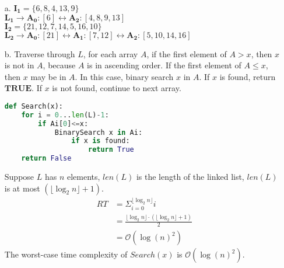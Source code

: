 \documentclass[10pt]{article}
\begin{document}
\begin{itemize}
\item[a.]
$\boldsymbol{I_1}=\{6,8,4,13,9\}$\\
$\boldsymbol{L_1}\rightarrow \boldsymbol{A_0}:[6]\leftrightarrow \boldsymbol{A_2}:[4,8,9,13]$\\
$\boldsymbol{I_2}=\{21,12,7,14,5,16,10\}$\\
$\boldsymbol{L_2}\rightarrow \boldsymbol{A_0}:[21]\leftrightarrow \boldsymbol{A_1}:[7,12]\leftrightarrow \boldsymbol{A_2}:[5,10,14,16]$
\item[b.]
Traverse through $L$, for each array $A$, if the first element of $A>x$, then $x$ is not in $A$, because $A$ is in ascending order. If the first element of $A\leq x$, then $x$ may be in $A$. In this case, binary search $x$ in $A$. If $x$ is found, return $\boldsymbol{TRUE}$. If $x$ is not found, continue to next array.
\begin{lstlisting}[language=Python]
def Search(x):
	for i = 0...len(L)-1:
		if Ai[0]<=x:
			BinarySearch x in Ai:
				if x is found:
					return True
	return False
\end{lstlisting}
Suppose $L$ has $n$ elements, $len(L)$ is the length of the linked list, $len(L)$ is at most $(\lfloor\log_2n\rfloor + 1)$.
\begin{align*}
RT &= \Sigma^{\lfloor\log_2n\rfloor}_{i=0}i\\
&=\frac{\lfloor\log_2n\rfloor\cdot(\lfloor\log_2n\rfloor+1)}{2}\\
&=\mathcal{O}(\log(n)^2)
\end{align*}
The worst-case time complexity of $Search(x)$ is $\mathcal{O}(\log(n)^2)$.



\end{itemize}
\end{document}
